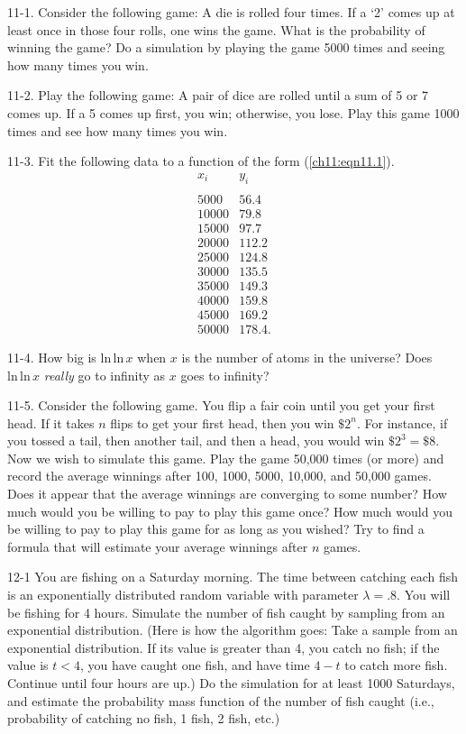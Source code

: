 \documentclass{stml-l}
\theoremstyle{definition}
\numberwithin{equation}{chapter}
\numberwithin{figure}{chapter}
\numberwithin{figure}{section}
\begin{document}
11-1. Consider the following game: A die is rolled four times. If a
`2' comes up at least once in those four rolls, one wins the game.
What is the probability of winning the game? Do a simulation by
playing the game 5000 times and seeing how many times you win.

11-2. Play the following game: A pair of dice are rolled until a sum
of 5 or 7 comes up. If a 5 comes up first, you win; otherwise, you
lose. Play this game 1000 times and see how many times you win.

11-3. Fit the following data to a function of the form
(\ref{ch11:eqn11.1}).
\begin{equation*}
\begin{array}{ll}
x_{i}& y_{i}\\
 & \\
5000& 56.4\\
10000& 79.8\\
15000& 97.7\\
20000& 112.2\\
25000& 124.8\\
30000& 135.5\\
35000& 149.3\\
40000& 159.8\\
45000& 169.2\\
50000& 178.4.\end{array}
\end{equation*}

11-4. How big is $\mathrm{ln\,ln}\,x$ when $x$ is the number of
atoms in the universe? Does $\mathrm{ln\,ln}\,x$ \emph{really} go to
infinity as $x$ goes to infinity?

11-5. Consider the following game. You flip a fair coin until you
get your first head. If it takes $n$ flips to get your first head,
then you win ${{\$}} 2^{n}$. For instance, if you tossed a tail,
then another tail, and then a head, you would win ${{\$}}
2^{3}={{\$}} 8$. Now we wish to simulate this game. Play the game
50,000 times (or more) and record the average winnings after 100,
1000, 5000, 10,000, and 50,000 games. Does it appear that the
average winnings are converging to some number? How much would you
be willing to pay to play this game once? How much would you be
willing to pay to play this game for as long as you wished? Try to
find a formula that will estimate your average winnings after $n$
games.

12-1 You are fishing on a Saturday morning. The time between catching
each fish is an exponentially distributed random variable with
parameter $\lambda =.8$. You will be fishing for 4 hours. Simulate
the number of fish caught by sampling from an exponential
distribution. (Here is how the algorithm goes: Take a sample from an
exponential distribution. If its value is greater than 4, you catch
no fish; if the value is $t<4$, you have caught one fish, and have
time $4-t$ to catch more fish. Continue until four hours are up.) Do
the simulation for at least 1000 Saturdays, and estimate the
probability mass function of the number of fish caught (i.e.,
probability of catching no fish, 1 fish, 2 fish, etc.)
\end{document}
